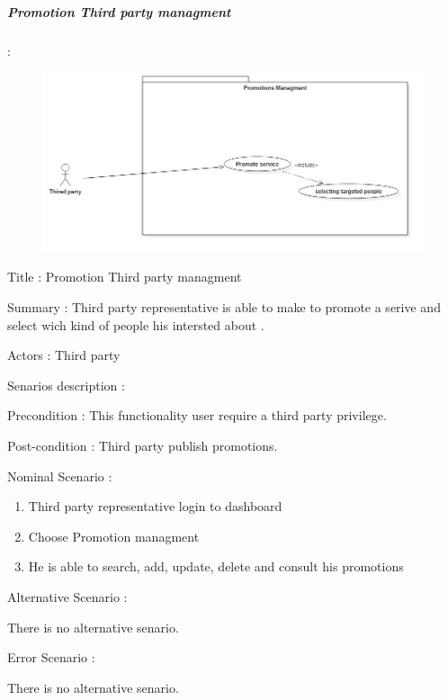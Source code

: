 \subparagraph{Promotion Third party managment} :
\label{sec:sec01} 

 \begin{figure}[H]
	\centering
	\includegraphics[height=0.3\textheight]{fig01/PromotionThiredPartyUseCaseDiagram}
	\label{fig:FilialesEtClients}
\end{figure}

\begin{flushleft}

Title : Promotion Third party  managment

Summary : 
Third party representative is able to make to promote a serive and select wich kind of people his intersted about .

Actors : Third party

Senarios description :


Precondition : This functionality user require a third party privilege.

Post-condition : Third party publish promotions.

Nominal Scenario :

 \begin{enumerate}
   \item Third party representative login to dashboard
   \item Choose Promotion managment
   \item He is able to search, add, update, delete and consult his promotions
 \end{enumerate}

Alternative Scenario :

There is no alternative senario.

Error Scenario :

There is no alternative senario.

\end{flushleft}

